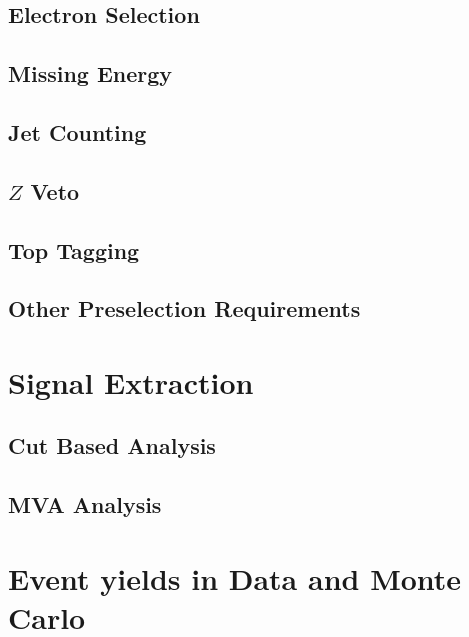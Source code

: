 \documentclass{cmspaper}
\begin{document}
  \subsection{Electron Selection} 
    \label{sec:sel_electrons}
    
  \subsection{Missing Energy} 
    \label{sec:sel_met}
%    
  \subsection{Jet Counting} 
    \label{sec:sel_jets}
    
  \subsection{$Z$ Veto}
    \label{sec:sel_zveto}
    
  \subsection{Top Tagging}
    \label{sec:sel_toptag}
    
  \subsection{Other Preselection Requirements}
    \label{sec:sel_other}
    

\section{Signal Extraction}
  \label{sec:signal_selection}
  \subsection{Cut Based Analysis}
    \label{sec:anal_cutbased}
%    
  \subsection{MVA Analysis}
    \label{sec:anal_mva}
%    
%    

\section{Event yields in Data and Monte Carlo}
  \label{sec:yields}
\end{document}
